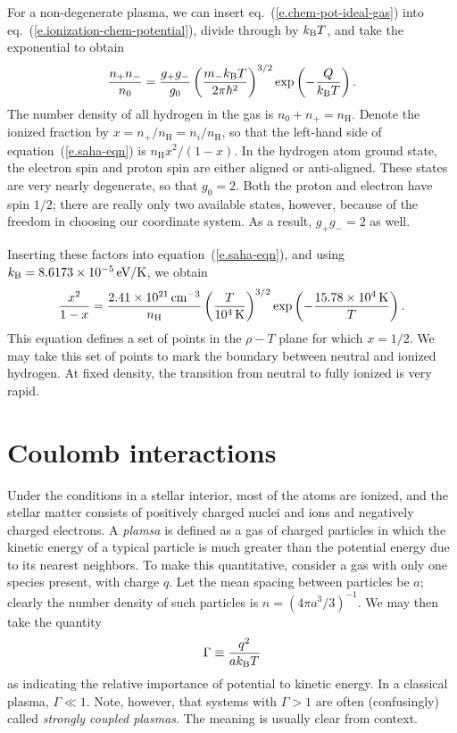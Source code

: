 For a non-degenerate plasma, we can insert eq.~(\ref{e.chem-pot-ideal-gas}) into eq.~(\ref{e.ionization-chem-potential}), divide through by $k_\mathrm{B} T$, and take the exponential to obtain
\begin{equation}\label{e.saha-eqn}
\frac{n_{+}n_{-}}{n_{0}} = \frac{g_{+}g_{-}}{g_{0}}\left(\frac{m_{-}k_\mathrm{B} T}{2\pi\hbar^{2}}\right)^{3/2}\exp\left(-\frac{Q}{k_\mathrm{B} T}\right).
\end{equation}
The number density of all hydrogen in the gas is $n_{0}+n_{+} = n_{\mathrm{H}}$.  Denote the ionized fraction by $x = n_{+}/n_{\mathrm{H}} = n_{i}/n_{\mathrm{H}}$, so that the left-hand side of equation~(\ref{e.saha-eqn}) is $n_{\mathrm{H}} x^{2}/(1-x)$. In the hydrogen atom ground state, the electron spin and proton spin are either aligned or anti-aligned. These states are very nearly degenerate, so that $g_{0} = 2$.  Both the proton and electron have spin $1/2$; there are really only two available states, however, because of the freedom in choosing our coordinate system.  As a result, $g_{+}g_{-} = 2$ as well.

Inserting these factors into equation~(\ref{e.saha-eqn}), and using $k_\mathrm{B} = 8.6173\times 10^{-5}\,\mathrm{eV}/\mathrm{K}$, we obtain
\begin{equation}\label{e.saha-reduced}
\frac{x^{2}}{1-x} = \frac{2.41\times 10^{21}\,\mathrm{c}\mathrm{m}^{-3}}{n_{\mathrm{H}}} \left(\frac{T}{10^{4}\,\mathrm{K}}\right)^{3/2}\exp\left(-\frac{15.78\times 10^{4}\,\mathrm{K}}{T}\right).
\end{equation}
This equation defines a set of points in the $\rho-T$ plane for which $x = 1/2$.  We may take this set of points to mark the boundary between neutral and ionized hydrogen. At fixed density, the transition from neutral to fully ionized is very rapid.

\section{Coulomb interactions}
Under the conditions in a stellar interior, most of the atoms are ionized, and the stellar matter consists of positively charged nuclei and ions and negatively charged electrons. A \emph{plamsa} is defined as a gas of charged particles in which the kinetic energy of a typical particle is much greater than the potential energy due to its nearest neighbors. To make this quantitative, consider a gas with only one species present, with charge $q$.  Let the mean spacing between particles be $a$; clearly the number density of such particles is $n = (4\pi a^{3}/3)^{-1}$.  We may then take the quantity
\begin{equation}\label{e.Gamma-definition}
\Gamma \equiv \frac{q^{2}}{ak_\mathrm{B} T}
\end{equation}
as indicating the relative importance of potential to kinetic energy.  In a classical plasma, $\Gamma \ll 1$.  Note, however, that systems with $\Gamma > 1$ are often (confusingly) called  \emph{strongly coupled plasmas}. The meaning is usually clear from context.

